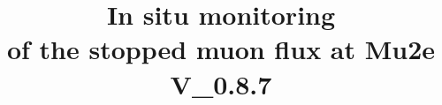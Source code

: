 \documentclass[12pt,a4paper,openright, oneside, titlepage]{book} %
\title{In situ monitoring\\ of the stopped muon flux at Mu2e\\\textbf{V\_0.8.7}}
\begin{document}
\frontmatter

\maketitle
\end{document}
